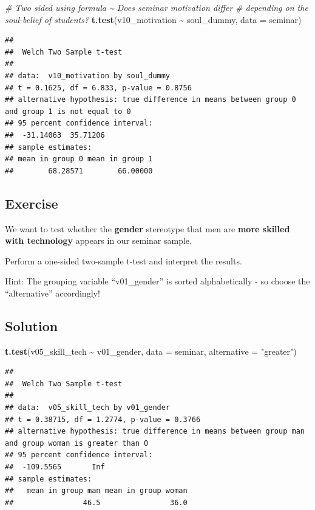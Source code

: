 \documentclass[
]{book}
\newenvironment{Shaded}{\begin{snugshade}}{\end{snugshade}}
\newcommand{\AttributeTok}[1]{\textcolor[rgb]{0.13,0.29,0.53}{#1}}
\newcommand{\CommentTok}[1]{\textcolor[rgb]{0.56,0.35,0.01}{\textit{#1}}}
\newcommand{\FunctionTok}[1]{\textcolor[rgb]{0.13,0.29,0.53}{\textbf{#1}}}
\newcommand{\NormalTok}[1]{#1}
\newcommand{\SpecialCharTok}[1]{\textcolor[rgb]{0.81,0.36,0.00}{\textbf{#1}}}
\newcommand{\StringTok}[1]{\textcolor[rgb]{0.31,0.60,0.02}{#1}}
\begin{document}
\begin{Shaded}
\begin{Highlighting}[]
\CommentTok{\# Two sided using formula \textasciitilde{} Does seminar motivation differ}
\CommentTok{\# depending on the soul{-}belief of students?}
\FunctionTok{t.test}\NormalTok{(v10\_motivation }\SpecialCharTok{\textasciitilde{}}\NormalTok{ soul\_dummy, }\AttributeTok{data =}\NormalTok{ seminar)}
\end{Highlighting}
\end{Shaded}

\begin{verbatim}
## 
##  Welch Two Sample t-test
## 
## data:  v10_motivation by soul_dummy
## t = 0.1625, df = 6.833, p-value = 0.8756
## alternative hypothesis: true difference in means between group 0 and group 1 is not equal to 0
## 95 percent confidence interval:
##  -31.14063  35.71206
## sample estimates:
## mean in group 0 mean in group 1 
##        68.28571        66.00000
\end{verbatim}

\subsection{\texorpdfstring{Exercise }{Exercise }}\label{exercise-7}

We want to test whether the \textbf{gender} stereotype that men are \textbf{more skilled with technology} appears in our seminar sample.

Perform a one-sided two-sample t-test and interpret the results.

Hint: The grouping variable ``v01\_gender'' is sorted alphabetically - so choose the ``alternative'' accordingly!

\subsection{\texorpdfstring{Solution }{Solution }}\label{solution-11}

\begin{Shaded}
\begin{Highlighting}[]
\FunctionTok{t.test}\NormalTok{(v05\_skill\_tech }\SpecialCharTok{\textasciitilde{}}\NormalTok{ v01\_gender, }\AttributeTok{data =}\NormalTok{ seminar, }\AttributeTok{alternative =} \StringTok{"greater"}\NormalTok{)}
\end{Highlighting}
\end{Shaded}

\begin{verbatim}
## 
##  Welch Two Sample t-test
## 
## data:  v05_skill_tech by v01_gender
## t = 0.38715, df = 1.2774, p-value = 0.3766
## alternative hypothesis: true difference in means between group man and group woman is greater than 0
## 95 percent confidence interval:
##  -109.5565       Inf
## sample estimates:
##   mean in group man mean in group woman 
##                46.5                36.0
\end{verbatim}
\end{document}
